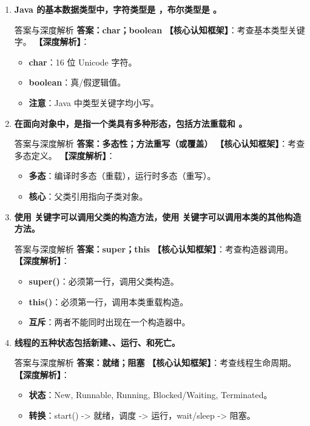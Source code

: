\documentclass[12pt, a4paper]{ctexart}
\newcommand{\blank}{\underline{\hspace{2em}}}
\begin{document}
\begin{enumerate}[label=\textbf{\arabic*.}, leftmargin=*, itemsep=1.5em]
\item \textbf{Java 的基本数据类型中，字符类型是 \blank，布尔类型是 \blank。}
\begin{bluebox}{答案与深度解析}
\textbf{答案：char；boolean}
\textbf{【核心认知框架】}：考查基本类型关键字。
\textbf{【深度解析】}：
\begin{itemize}[leftmargin=*, nosep]
    \item \textbf{char}：16 位 Unicode 字符。
    \item \textbf{boolean}：真/假逻辑值。
    \item \textbf{注意}：Java 中类型关键字均小写。
\end{itemize}
\end{bluebox}

\item \textbf{在面向对象中，\blank 是指一个类具有多种形态，包括方法重载和 \blank。}
\begin{bluebox}{答案与深度解析}
\textbf{答案：多态性；方法重写（或覆盖）}
\textbf{【核心认知框架】}：考查多态定义。
\textbf{【深度解析】}：
\begin{itemize}[leftmargin=*, nosep]
    \item \textbf{多态}：编译时多态（重载），运行时多态（重写）。
    \item \textbf{核心}：父类引用指向子类对象。
\end{itemize}
\end{bluebox}

\item \textbf{使用 \blank 关键字可以调用父类的构造方法，使用 \blank 关键字可以调用本类的其他构造方法。}
\begin{bluebox}{答案与深度解析}
\textbf{答案：super；this}
\textbf{【核心认知框架】}：考查构造器调用。
\textbf{【深度解析】}：
\begin{itemize}[leftmargin=*, nosep]
    \item \textbf{super()}：必须第一行，调用父类构造。
    \item \textbf{this()}：必须第一行，调用本类重载构造。
    \item \textbf{互斥}：两者不能同时出现在一个构造器中。
\end{itemize}
\end{bluebox}

\item \textbf{线程的五种状态包括新建、\blank、运行、\blank 和死亡。}
\begin{bluebox}{答案与深度解析}
\textbf{答案：就绪；阻塞}
\textbf{【核心认知框架】}：考查线程生命周期。
\textbf{【深度解析】}：
\begin{itemize}[leftmargin=*, nosep]
    \item \textbf{状态}：New, Runnable, Running, Blocked/Waiting, Terminated。
    \item \textbf{转换}：start() -> 就绪，调度 -> 运行，wait/sleep -> 阻塞。
\end{itemize}
\end{bluebox}


\end{enumerate}
\end{document}
